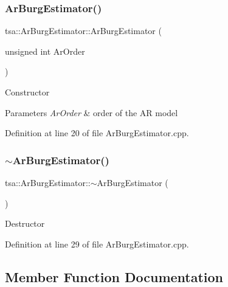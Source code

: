\subsubsection{\texorpdfstring{Ar\+Burg\+Estimator()}{ArBurgEstimator()}}
{\footnotesize\ttfamily tsa\+::\+Ar\+Burg\+Estimator\+::\+Ar\+Burg\+Estimator (\begin{DoxyParamCaption}\item[{unsigned int}]{Ar\+Order }\end{DoxyParamCaption})}

Constructor 
\begin{DoxyParams}{Parameters}
{\em Ar\+Order} & order of the AR model \\
\hline
\end{DoxyParams}


Definition at line 20 of file Ar\+Burg\+Estimator.\+cpp.

\mbox{\label{classtsa_1_1_ar_burg_estimator_a4b72f798ee5330d446366c4296aec27b}} 
\subsubsection{\texorpdfstring{$\sim$\+Ar\+Burg\+Estimator()}{~ArBurgEstimator()}}
{\footnotesize\ttfamily tsa\+::\+Ar\+Burg\+Estimator\+::$\sim$\+Ar\+Burg\+Estimator (\begin{DoxyParamCaption}{ }\end{DoxyParamCaption})\hspace{0.3cm}{\ttfamily [virtual]}}

Destructor 

Definition at line 29 of file Ar\+Burg\+Estimator.\+cpp.



\subsection{Member Function Documentation}
\mbox{\label{classtsa_1_1_ar_burg_estimator_a4c318ac037fabbad13f506e97576034a}} 
